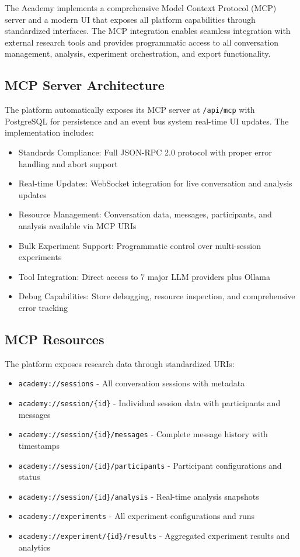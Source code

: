 \documentclass[11pt,letterpaper]{article}
\newcommand{\theacademy}{The Academy}
\begin{document}
\theacademy{} implements a comprehensive Model Context Protocol (MCP) server and a modern UI that exposes all platform capabilities through standardized interfaces. The MCP integration enables seamless integration with external research tools and provides programmatic access to all conversation management, analysis, experiment orchestration, and export functionality.

\subsection{MCP Server Architecture}

The platform automatically exposes its MCP server at \texttt{/api/mcp} with PostgreSQL for persistence and an event bus system real-time UI updates. The implementation includes:

\begin{itemize}
    \item Standards Compliance: Full JSON-RPC 2.0 protocol with proper error handling and abort support
    \item Real-time Updates: WebSocket integration for live conversation and analysis updates
    \item Resource Management: Conversation data, messages, participants, and analysis available via MCP URIs
    \item Bulk Experiment Support: Programmatic control over multi-session experiments
    \item Tool Integration: Direct access to 7 major LLM providers plus Ollama
    \item Debug Capabilities: Store debugging, resource inspection, and comprehensive error tracking
\end{itemize}

\subsection{MCP Resources}

The platform exposes research data through standardized URIs:
\begin{itemize}
    \item \texttt{academy://sessions} - All conversation sessions with metadata
    \item \texttt{academy://session/\{id\}} - Individual session data with participants and messages
    \item \texttt{academy://session/\{id\}/messages} - Complete message history with timestamps
    \item \texttt{academy://session/\{id\}/participants} - Participant configurations and status
    \item \texttt{academy://session/\{id\}/analysis} - Real-time analysis snapshots
    \item \texttt{academy://experiments} - All experiment configurations and runs
    \item \texttt{academy://experiment/\{id\}/results} - Aggregated experiment results and analytics
\end{itemize}
\end{document}
